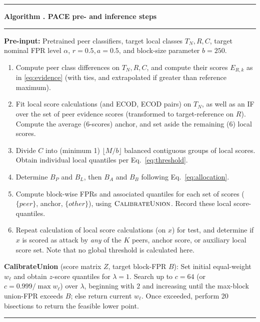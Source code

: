 \FloatBarrier 
\begin{table}[!htbp] 
\centering 
\begin{minipage}{0.96\textwidth} 
\hrule\smallskip 
{}\textbf{Algorithm \thealgorithm. PACE pre- and inference steps}\label{alg:pace} 
\smallskip\hrule\smallskip 
\small 
\textbf{Pre-input: } Pretrained peer classifiers, target local classes $T_N,R,C$, target nominal FPR level $\alpha$, $r=0.5, a=0.5$, and block-size parameter $b=250$.
\begin{enumerate} 
\setlength{\itemsep}{2pt}\setlength{\parskip}{0pt} 
\item Compute peer class differences on $T_N,R,C$, and compute their scores $E_{R,k}$ as in \ref{eq:evidence} (with ties, and extrapolated if greater than reference maximum).
\item Fit local score calculations (and ECOD, ECOD pairs) on $T_N$, as well as an IF over the set of peer evidence scores (transformed to target-reference on $R$). Compute the average (6-scores) anchor, and set aside the remaining (6) local scores.
\item Divide $C$ into (minimum 1) $\lfloor M/b \rfloor$ balanced contiguous groups of local scores. Obtain individual local quantiles per Eq.~\ref{eq:threshold}.
\item Determine $B_P$ and $B_L$, then $B_A$ and $B_B$ following Eq.~\ref{eq:allocation}.
\item Compute block-wise FPRs and associated quantiles for each set of scores ($\{peer\}$, anchor, $\{other\}$), using $\textsc{CalibrateUnion}$. Record these local score-quantiles. 
\item Repeat calculation of local score calculations (on $x$) for test, and determine if $x$ is scored as attack by \emph{any} of the $K$ peers, anchor score, or auxiliary local score set. Note that no global threshold is calculated here.
\end{enumerate} 
\textbf{CalibrateUnion} (score matrix $Z$, target block-FPR $B$): Set initial equal-weight $w_\ell$ and obtain $z$-score quantiles for $\lambda=1$. Search up to $c=64$ (or $c=0.999/\max w_\ell$) over $\lambda$, beginning with $2$ and increasing until the max-block union-FPR exceeds $B$; else return current $w_\ell$. Once exceeded, perform 20 bisections to return the feasible lower point.
\smallskip\hrule 
\end{minipage} 
\end{table} 